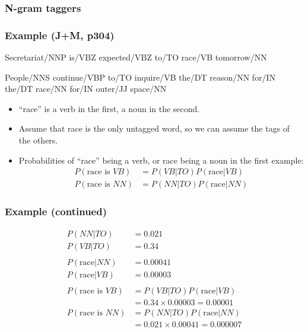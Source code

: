 \documentclass{beamer}             %
\begin{document}
\begin{frame}
  \frametitle{N-gram taggers}
\end{frame}

\begin{frame}
  \frametitle{Example (J+M, p304)}
  {\small
  Secretariat/NNP is/VBZ expected/VBZ to/TO \alert{race/VB} tomorrow/NN

  \medskip
  People/NNS continue/VBP to/TO inquire/VB the/DT reason/NN for/IN the/DT
  \alert{race/NN} for/IN outer/JJ space/NN
  }

  \begin{itemize}
  \item<2-> ``race'' is a verb in the first, a noun in the second.
  \item<3-> Assume that race is the only untagged word, so we can assume
    the tags of the others.
  \item<4-> Probabilities of ``race'' being a verb, or race being a noun
    in the first example:
    \begin{align*}
      P(\mbox{race is }VB) &= P(VB|TO) P(\mbox{race}|VB) \\
      P(\mbox{race is }NN) &= P(NN|TO) P(\mbox{race}|NN) 
    \end{align*}
  \end{itemize}
\end{frame}

\begin{frame}
  \frametitle{Example (continued)}
  \begin{align*}
    P(NN|TO) &= 0.021 \\
    P(VB|TO) &= 0.34 \\
    \\
    P(\mbox{race}|NN) &= 0.00041\\
    P(\mbox{race}|VB) &= 0.00003\\
    \\
    P(\mbox{race is }VB) &= P(VB|TO) P(\mbox{race}|VB) \\
    &= 0.34 \times 0.00003 = 0.00001 \\
    P(\mbox{race is }NN) &= P(NN|TO) P(\mbox{race}|NN) \\
    &= 0.021 \times 0.00041 = 0.000007
   \end{align*}
\end{frame}
\end{document}
